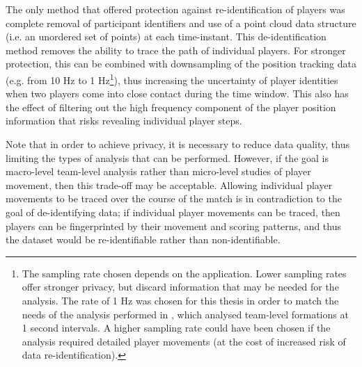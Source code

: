 The only method that offered protection against re-identification of players was complete removal of participant identifiers and use of a point cloud data structure (i.e. an unordered set of points) at each time-instant. This de-identification method removes the ability to trace the path of individual players. For stronger protection, this can be combined with downsampling of the position tracking data (e.g. from 10 Hz to 1 Hz\footnote{The sampling rate chosen depends on the application. Lower sampling rates offer stronger privacy, but discard information that may be needed for the analysis. The rate of 1 Hz was chosen for this thesis in order to match the needs of the analysis performed in , which analysed team-level formations at 1 second intervals. A higher sampling rate could have been chosen if the analysis required detailed player movements (at the cost of increased risk of data re-identification).}), thus increasing the uncertainty of player identities when two players come into close contact during the time window. This also has the effect of filtering out the high frequency component of the player position information that risks revealing individual player steps.

Note that in order to achieve privacy, it is necessary to reduce data quality, thus limiting the types of analysis that can be performed. However, if the goal is macro-level team-level analysis rather than micro-level studies of player movement, then this trade-off may be acceptable. Allowing individual player movements to be traced over the course of the match is in contradiction to the goal of de-identifying data; if individual player movements can be traced, then players can be fingerprinted by their movement and scoring patterns, and thus the dataset would be re-identifiable rather than non-identifiable.
